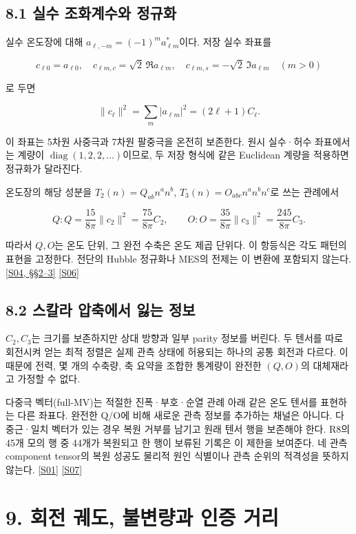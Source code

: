 \documentclass[11pt,a4paper]{article}
\begin{document}
\subsection*{8.1 실수 조화계수와 정규화}

실수 온도장에 대해 \(a_{\ell,-m}=(-1)^m a_{\ell m}^*\)이다. 저장 실수 좌표를


\[
c_{\ell0}=a_{\ell0},\quad
c_{\ell m,c}=\sqrt2\,\Re a_{\ell m},\quad
c_{\ell m,s}=-\sqrt2\,\Im a_{\ell m}\quad(m>0)
\]

로 두면


\[
\|c_\ell\|^2=\sum_m|a_{\ell m}|^2=(2\ell+1)C_\ell.
\]

이 좌표는 5차원 사중극과 7차원 팔중극을 온전히 보존한다. 원시 실수·허수 좌표에서는 계량이 \(\operatorname{diag}(1,2,2,\ldots)\)이므로, 두 저장 형식에 같은 Euclidean 계량을 적용하면 정규화가 달라진다.


온도장의 해당 성분을 \(T_2(n)=Q_{ab}n^an^b\), \(T_3(n)=O_{abc}n^an^bn^c\)로 쓰는 관례에서


\[
Q:Q=\frac{15}{8\pi}\|c_2\|^2=\frac{75}{8\pi}C_2,
\qquad
O:O=\frac{35}{8\pi}\|c_3\|^2=\frac{245}{8\pi}C_3.
\]

따라서 \(Q,O\)는 온도 단위, 그 완전 수축은 온도 제곱 단위다. 이 항등식은 각도 패턴의 표현을 고정한다. 전단의 Hubble 정규화나 MES의 전제는 이 변환에 포함되지 않는다. \hyperlink{src:S04}{[S04, §§2–3]} \hyperlink{src:S06}{[S06]}


\subsection*{8.2 스칼라 압축에서 잃는 정보}

\(C_2,C_3\)는 크기를 보존하지만 상대 방향과 일부 parity 정보를 버린다. 두 텐서를 따로 회전시켜 얻는 최적 정렬은 실제 관측 상태에 허용되는 하나의 공통 회전과 다르다. 이 때문에 전력, 몇 개의 수축량, 축 요약을 조합한 통계량이 완전한 \((Q,O)\)의 대체재라고 가정할 수 없다.


다중극 벡터(full-MV)는 적절한 진폭·부호·순열 관례 아래 같은 온도 텐서를 표현하는 다른 좌표다. 완전한 Q/O에 비해 새로운 관측 정보를 추가하는 채널은 아니다. 다중근·일치 벡터가 있는 경우 복원 거부를 남기고 원래 텐서 행을 보존해야 한다. R8의 45개 모의 행 중 44개가 복원되고 한 행이 보류된 기록은 이 제한을 보여준다. 네 관측 component tensor의 복원 성공도 물리적 원인 식별이나 관측 순위의 적격성을 뜻하지 않는다. \hyperlink{src:S01}{[S01]} \hyperlink{src:S07}{[S07]}


\hypertarget{s9}{}

\section*{9. 회전 궤도, 불변량과 인증 거리}
\end{document}
